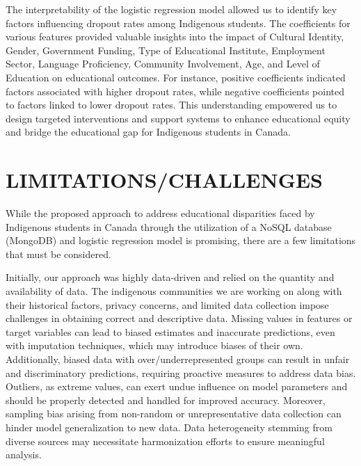 \documentclass[a4paper,twoside]{article}
\begin{document}
The interpretability of the logistic regression model allowed us to identify key factors influencing dropout rates among Indigenous students. The coefficients for various features provided valuable insights into the impact of Cultural Identity, Gender, Government Funding, Type of Educational Institute, Employment Sector, Language Proficiency, Community Involvement, Age, and Level of Education on educational outcomes. For instance, positive coefficients indicated factors associated with higher dropout rates, while negative coefficients pointed to factors linked to lower dropout rates. This understanding empowered us to design targeted interventions and support systems to enhance educational equity and bridge the educational gap for Indigenous students in Canada.





\section{\uppercase{Limitations/Challenges}}
While the proposed approach to address educational disparities faced by Indigenous students in Canada through the utilization of a NoSQL database (MongoDB) and logistic regression model is promising, there are a few limitations that must be considered.

Initially, our approach was highly data-driven and relied on the quantity and availability of data. The indigenous communities we are working on along with their historical factors, privacy concerns, and limited data collection impose challenges in obtaining correct and descriptive data. Missing values in features or target variables can lead to biased estimates and inaccurate predictions, even with imputation techniques, which may introduce biases of their own. Additionally, biased data with over/underrepresented groups can result in unfair and discriminatory predictions, requiring proactive measures to address data bias. Outliers, as extreme values, can exert undue influence on model parameters and should be properly detected and handled for improved accuracy. Moreover, sampling bias arising from non-random or unrepresentative data collection can hinder model generalization to new data. Data heterogeneity stemming from diverse sources may necessitate harmonization efforts to ensure meaningful analysis.
\end{document}
